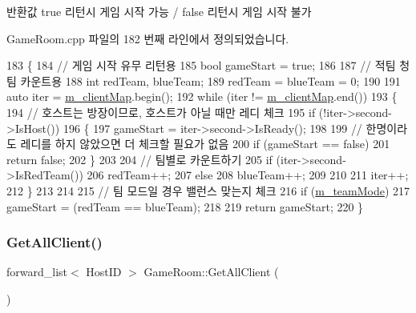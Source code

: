 \begin{DoxyReturn}{반환값}
true 리턴시 게임 시작 가능 / false 리턴시 게임 시작 불가 
\end{DoxyReturn}


Game\+Room.\+cpp 파일의 182 번째 라인에서 정의되었습니다.


\begin{DoxyCode}
183 \{
184     \textcolor{comment}{// 게임 시작 유무 리턴용}
185     \textcolor{keywordtype}{bool} gameStart = \textcolor{keyword}{true};
186 
187     \textcolor{comment}{// 적팀 청팀 카운트용}
188     \textcolor{keywordtype}{int} redTeam,  blueTeam;
189     redTeam = blueTeam = 0;
190 
191     \textcolor{keyword}{auto} iter = \hyperlink{class_game_room_afc202a511605453216f7dd870ff96c5c}{m\_clientMap}.begin();
192     \textcolor{keywordflow}{while} (iter != \hyperlink{class_game_room_afc202a511605453216f7dd870ff96c5c}{m\_clientMap}.end())
193     \{
194         \textcolor{comment}{// 호스트는 방장이므로, 호스트가 아닐 때만 레디 체크}
195         \textcolor{keywordflow}{if} (!iter->second->IsHost())
196         \{
197             gameStart = iter->second->IsReady();
198 
199             \textcolor{comment}{// 한명이라도 레디를 하지 않았으면 더 체크할 필요가 없음}
200             \textcolor{keywordflow}{if} (gameStart == \textcolor{keyword}{false})
201                 \textcolor{keywordflow}{return} \textcolor{keyword}{false};
202         \}
203 
204         \textcolor{comment}{// 팀별로 카운트하기}
205         \textcolor{keywordflow}{if} (iter->second->IsRedTeam())
206             redTeam++;
207         \textcolor{keywordflow}{else}
208             blueTeam++;
209 
210 
211         iter++;
212     \}
213 
214 
215     \textcolor{comment}{// 팀 모드일 경우 밸런스 맞는지 체크}
216     \textcolor{keywordflow}{if} (\hyperlink{class_game_room_aef7875998ee1bf83eb23e249b5659bc7}{m\_teamMode})
217         gameStart = (redTeam == blueTeam);
218 
219     \textcolor{keywordflow}{return} gameStart;
220 \}
\end{DoxyCode}
\mbox{\label{class_game_room_a183a24527a56433cc85b1cd1c86012a8}} 
\subsubsection{\texorpdfstring{Get\+All\+Client()}{GetAllClient()}}
{\footnotesize\ttfamily forward\+\_\+list$<$ Host\+ID $>$ Game\+Room\+::\+Get\+All\+Client (\begin{DoxyParamCaption}{ }\end{DoxyParamCaption})}



